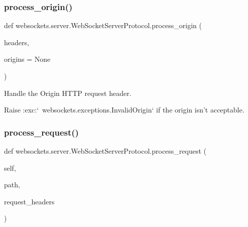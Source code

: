\subsubsection{\texorpdfstring{process\+\_\+origin()}{process\_origin()}}
{\footnotesize\ttfamily def websockets.\+server.\+Web\+Socket\+Server\+Protocol.\+process\+\_\+origin (\begin{DoxyParamCaption}\item[{}]{headers,  }\item[{}]{origins = {\ttfamily None} }\end{DoxyParamCaption})\hspace{0.3cm}{\ttfamily [static]}}

\begin{DoxyVerb}Handle the Origin HTTP request header.

Raise :exc:`~websockets.exceptions.InvalidOrigin` if the origin isn't
acceptable.\end{DoxyVerb}
 \mbox{\label{classwebsockets_1_1server_1_1_web_socket_server_protocol_a128b1f24cae9c580c2fa1c98a5755315}} 
\subsubsection{\texorpdfstring{process\+\_\+request()}{process\_request()}}
{\footnotesize\ttfamily def websockets.\+server.\+Web\+Socket\+Server\+Protocol.\+process\+\_\+request (\begin{DoxyParamCaption}\item[{}]{self,  }\item[{}]{path,  }\item[{}]{request\+\_\+headers }\end{DoxyParamCaption})}


